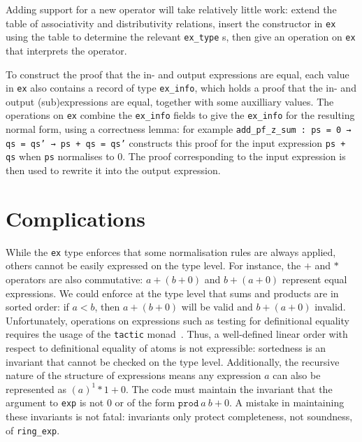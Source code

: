 \documentclass{llncs}
\newcommand{\lean}[1]{\texttt{#1}\xspace} %
\newcommand{\ex}{\lean{ex}}
\newcommand{\ringexp}{\lean{ring\_exp}}
\begin{document}
Adding support for a new operator will take relatively little work:
extend the table of associativity and distributivity relations,
insert the constructor in \ex using the table to determine the relevant \lean{ex\_type}s,
then give an operation on \ex that interprets the operator.

To construct the proof that the in- and output expressions are equal,
each value in \ex also contains a record of type \lean{ex\_info},
which holds a proof that the in- and output (sub)expressions are equal, together with some auxilliary values.
The operations on \ex combine the \lean{ex\_info} fields to give the \lean{ex\_info} for the resulting normal form,
using a correctness lemma: for example \lean{add\_pf\_z\_sum : ps = 0 → qs = qs' → ps + qs = qs'} constructs this proof for the input expression \lean{ps + qs} when \lean{ps} normalises to $0$.
The proof corresponding to the input expression is then used to rewrite it into the output expression.


\section{Complications}

While the \ex type enforces that some normalisation rules are always applied,
others cannot be easily expressed on the type level.
For instance, the $+$ and $*$ operators are also commutative:
$a + (b + 0)$ and $b + (a + 0)$ represent equal expressions.
We could enforce at the type level that sums and products are in sorted order:
if $a < b$, then $a + (b + 0)$ will be valid and $b + (a + 0)$ invalid. 
Unfortunately, operations on expressions such as testing for definitional equality requires the usage of the \lean{tactic} monad~\cite{lean-tactics}.
Thus, a well-defined linear order with respect to definitional equality of atoms is not expressible:
sortedness is an invariant that cannot be checked on the type level.
Additionally, the recursive nature of the structure of expressions
means any expression $a$ can also be represented as $(a)^1*1 + 0$.
The code must maintain the invariant that the argument to \lean{exp} is not $0$ or of the form $\lean{prod}\ a\ b + 0$.
A mistake in maintaining these invariants is not fatal: invariants only protect completeness, not soundness, of \ringexp.
\end{document}

